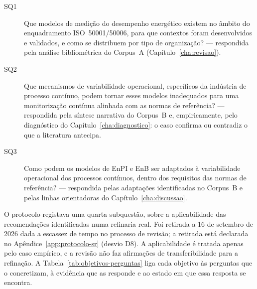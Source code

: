 \begin{description}
  \item[SQ1] Que modelos de medição do desempenho energético existem no
    âmbito do enquadramento ISO~50001/50006, para que contextos foram
    desenvolvidos e validados, e como se distribuem por tipo de
    organização? --- respondida pela análise bibliométrica do Corpus~A
    (Capítulo~\ref{cha:revisao}).
  \item[SQ2] Que mecanismos de variabilidade operacional, específicos da
    indústria de processo contínuo, podem tornar esses modelos
    inadequados para uma monitorização contínua alinhada com as normas
    de referência? --- respondida pela síntese narrativa do Corpus~B e,
    empiricamente, pelo diagnóstico do Capítulo~\ref{cha:diagnostico}: o
    caso confirma ou contradiz o que a literatura antecipa.
  \item[SQ3] Como podem os modelos de EnPI e EnB ser adaptados à
    variabilidade operacional dos processos contínuos, dentro dos
    requisitos das normas de referência? --- respondida pelas
    adaptações identificadas no Corpus~B e pelas linhas orientadoras do
    Capítulo~\ref{cha:discussao}.
\end{description}

O protocolo registava uma quarta subquestão, sobre a aplicabilidade das
recomendações identificadas numa refinaria real. Foi retirada a 16 de
setembro de 2026 dada a escassez de tempo no processo de revisão; a retirada está declarada no
Apêndice~\ref{app:protocolo-sr} (desvio D8). A aplicabilidade é tratada
apenas pelo caso empírico, e a revisão não faz afirmações de
transferibilidade para a refinação. A Tabela~\ref{tab:objetivos-perguntas}
liga cada objetivo às perguntas que o concretizam, à evidência que as
responde e ao estado em que essa resposta se encontra.

